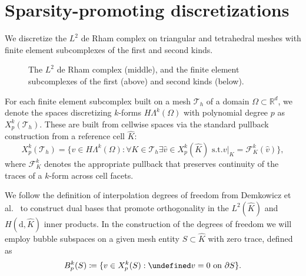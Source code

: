 \documentclass[review,onefignum,onetabnum,a4paper]{siamart190516}
\let\grad\undefined
\let\curl\undefined
\let\div\undefined
\let\tr\undefined
\DeclareMathOperator{\grad}{grad}
\DeclareMathOperator{\curl}{curl}
\DeclareMathOperator{\div}{div}
\DeclareMathOperator{\tr}{tr}
\DeclareMathOperator{\Exists}{\exists}
\DeclareMathOperator{\Forall}{\forall}
\newcommand{\Hgrad}{H(\grad)}
\newcommand{\Hcurl}{H(\curl)}
\newcommand{\Hdiv}{H(\div)}
\newcommand{\Ltwo}{L^2}
\newcommand{\mesh}{\mathcal{T}_h}
\newcommand{\pullback}{\mathcal{F}}
\newcommand{\Khat}{\hat{K}}
\newcommand{\CG}{\mathrm{CG}}
\newcommand{\DG}{\mathrm{DG}}
\newcommand{\Ned}{\mathrm{Ned}^{1}}
\newcommand{\RT}{\mathrm{RT}}
\newcommand{\BDM}{\mathrm{BDM}}
\newcommand{\NedTwo}{\mathrm{Ned}^{2}}
\newcommand{\pef}[1]{\todo[inline,color=blue!40]{PEF: #1}}
\begin{document}
\section{Sparsity-promoting discretizations} \label{sec:dofs}

We discretize the $\Ltwo$ de Rham complex on triangular and tetrahedral meshes with finite element subcomplexes of the first and second kinds.

\begin{figure}[htbp] 
\centering
{}
\caption{The $\Ltwo$ de Rham complex (middle), and the finite element subcomplexes of the first (above) and second kinds (below).}
\end{figure}
\pef{Fix vertical alignment}

For each finite element subcomplex built on a mesh $\mesh$ of a domain $\Omega \subset \mathbb{R}^d$, we denote the spaces discretizing $k$-forms $H\Lambda^k(\Omega)$ with polynomial degree $p$ as $X^k_p(\mesh)$.
These are built from cellwise spaces via the standard pullback construction from a reference cell $\Khat$:
\begin{equation}
X^k_p(\mesh) = \{ v \in H\Lambda^k(\Omega): \Forall K \in \mesh \Exists \hat{v} \in X^k_p(\Khat) \text{ s.t.} \left.v\right|_K = \pullback^k_K(\hat{v}) \},
\end{equation}
where $\pullback^k_K$ denotes the appropriate pullback that preserves continuity of the traces of a $k$-form across cell facets.

We follow the definition of interpolation degrees of freedom from
Demkowicz et al.~\cite{demkowicz00} to construct dual bases that promote orthogonality in the
$\Ltwo(\Khat)$ and $H(\mathrm{d}, \Khat)$ inner products.
In the construction of the degrees of freedom we will employ bubble subspaces on a given mesh entity $S \subset \Khat$ with zero trace, defined as
\begin{equation}
B^k_p(S) \coloneqq \{v \in X^k_p(S): \tr v = 0 \text{ on } \partial S\}.
\end{equation}
\end{document}
